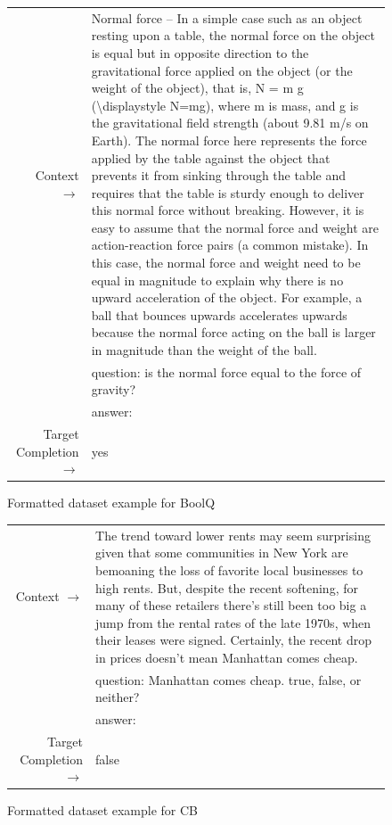 \documentclass{article}
\begin{document}
\begin{figure} { \tt \footnotesize \begin{tabularx}{\linewidth}{r X} \toprule Context $\to$ & Normal force -- In a simple case such as an object resting upon a table, the normal force on the object is equal but in opposite direction to the gravitational force applied on the object (or the weight of the object), that is, N = m g ({\textbackslash}displaystyle N=mg), where m is mass, and g is the gravitational field strength (about 9.81 m/s on Earth). The normal force here represents the force applied by the table against the object that prevents it from sinking through the table and requires that the table is sturdy enough to deliver this normal force without breaking. However, it is easy to assume that the normal force and weight are action-reaction force pairs (a common mistake). In this case, the normal force and weight need to be equal in magnitude to explain why there is no upward acceleration of the object. For example, a ball that bounces upwards accelerates upwards because the normal force acting on the ball is larger in magnitude than the weight of the ball. \\ 
 & question: is the normal force equal to the force of gravity? \\ 
 & answer: \\ 
 \midrule Target Completion $\to$ & yes\\ \bottomrule \end{tabularx} }  \caption{Formatted dataset example for BoolQ}  \label{eval:BoolQ}  \end{figure}
\begin{figure} { \tt \footnotesize \begin{tabularx}{\linewidth}{r X} \toprule Context $\to$ & The trend toward lower rents may seem surprising given that some communities in New York are bemoaning the loss of favorite local businesses to high rents. But, despite the recent softening, for many of these retailers there's still been too big a jump from the rental rates of the late 1970s, when their leases were signed. Certainly, the recent drop in prices doesn't mean Manhattan comes cheap. \\ 
 & question: Manhattan comes cheap. true, false, or neither? \\ 
 & answer: \\ 
 \midrule Target Completion $\to$ & false\\ \bottomrule \end{tabularx} }  \caption{Formatted dataset example for CB}  \label{eval:CB}  \end{figure}
\end{document}
